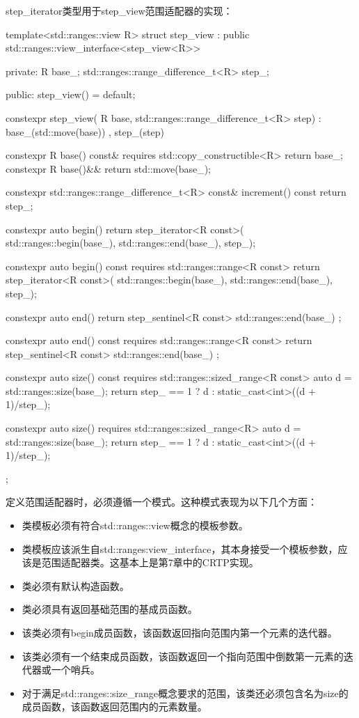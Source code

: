 step\_iterator类型用于step\_view范围适配器的实现：

\begin{cpp}
template<std::ranges::view R>
struct step_view :
	public std::ranges::view_interface<step_view<R>>
{
private:
	R base_;
	std::ranges::range_difference_t<R> step_;
	
public:
	step_view() = default;
	
	constexpr step_view(
		R base,
		std::ranges::range_difference_t<R> step)
			: base_(std::move(base))
			, step_(step)
	{
	}

	constexpr R base() const&
		requires std::copy_constructible<R>
	{ return base_; }
	constexpr R base()&& { return std::move(base_); }
	
	constexpr std::ranges::range_difference_t<R> const&
	increment() const
	{ return step_; }
	
	constexpr auto begin()
	{
		return step_iterator<R const>(
			std::ranges::begin(base_),
			std::ranges::end(base_), step_);
	}

	constexpr auto begin() const
	requires std::ranges::range<R const>
	{
		return step_iterator<R const>(
			std::ranges::begin(base_),
			std::ranges::end(base_), step_);
	}

	constexpr auto end()
	{
		return step_sentinel<R const>{
			std::ranges::end(base_) };
	}

	constexpr auto end() const
	requires std::ranges::range<R const>
	{
		return step_sentinel<R const>{
			std::ranges::end(base_) };
	}

	constexpr auto size() const
	requires std::ranges::sized_range<R const>
	{
		auto d = std::ranges::size(base_);
		return step_ == 1 ? d :
			static_cast<int>((d + 1)/step_); 
	}
	
	constexpr auto size()
	requires std::ranges::sized_range<R>
	{
		auto d = std::ranges::size(base_);
		return step_ == 1 ? d :
			static_cast<int>((d + 1)/step_);
	}
};
\end{cpp}

定义范围适配器时，必须遵循一个模式。这种模式表现为以下几个方面：

\begin{itemize}
  \item 类模板必须有符合std::ranges::view概念的模板参数。
  \item 类模板应该派生自std::ranges:view\_interface，其本身接受一个模板参数，应该是范围适配器类。这基本上是第7章中的CRTP实现。
  \item 类必须有默认构造函数。
  \item 类必须具有返回基础范围的基成员函数。
  \item 该类必须有begin成员函数，该函数返回指向范围内第一个元素的迭代器。
  \item 该类必须有一个结束成员函数，该函数返回一个指向范围中倒数第一元素的迭代器或一个哨兵。
  \item 对于满足std::ranges::size\_range概念要求的范围，该类还必须包含名为size的成员函数，该函数返回范围内的元素数量。
\end{itemize}

